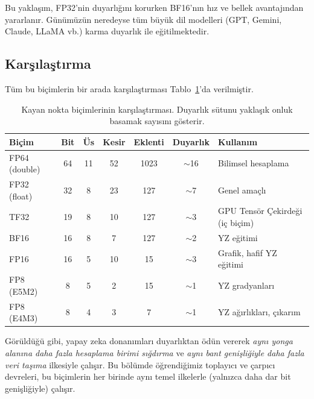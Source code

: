 Bu yaklaşım, FP32'nin duyarlığını korurken BF16'nın hız ve bellek avantajından yararlanır. Günümüzün neredeyse tüm büyük dil modelleri (GPT, Gemini, Claude, LLaMA vb.) karma duyarlık ile eğitilmektedir.

\subsection{Karşılaştırma}

Tüm bu biçimlerin bir arada karşılaştırması Tablo~\ref{tab:yapay-zeka-kn-bicimleri}'da verilmiştir.

\begin{table}[htbp]
\centering
\caption[Kayan nokta biçimlerinin karşılaştırması]{Kayan nokta biçimlerinin karşılaştırması. Duyarlık sütunu yaklaşık onluk basamak sayısını gösterir.}
\label{tab:yapay-zeka-kn-bicimleri}
\small
\begin{tabularx}{\textwidth}{l c c c c c X}
\toprule
\textbf{Biçim} & \textbf{Bit} & \textbf{Üs} & \textbf{Kesir} & \textbf{Eklenti} & \textbf{Duyarlık} & \textbf{Kullanım} \\
\midrule
FP64 (double) & 64 & 11 & 52 & 1023 & $\sim$16 & Bilimsel hesaplama \\
FP32 (float)  & 32 & 8  & 23 & 127  & $\sim$7  & Genel amaçlı \\
TF32          & 19 & 8  & 10 & 127  & $\sim$3  & GPU Tensör Çekirdeği (iç biçim) \\
BF16          & 16 & 8  & 7  & 127  & $\sim$2  & YZ eğitimi \\
FP16          & 16 & 5  & 10 & 15   & $\sim$3  & Grafik, hafif YZ eğitimi \\
FP8 (E5M2)    & 8  & 5  & 2  & 15   & $\sim$1  & YZ gradyanları \\
FP8 (E4M3)    & 8  & 4  & 3  & 7    & $\sim$1  & YZ ağırlıkları, çıkarım \\
\bottomrule
\end{tabularx}
\end{table}

Görüldüğü gibi, yapay zeka donanımları duyarlıktan ödün vererek \emph{aynı yonga alanına daha fazla hesaplama birimi sığdırma} ve \emph{aynı bant genişliğiyle daha fazla veri taşıma} ilkesiyle çalışır. Bu bölümde öğrendiğimiz toplayıcı ve çarpıcı devreleri, bu biçimlerin her birinde aynı temel ilkelerle (yalnızca daha dar bit genişliğiyle) çalışır.


